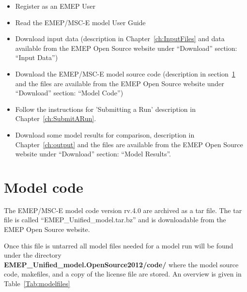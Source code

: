 \begin{itemize}
\item Register as an EMEP User
\item Read the EMEP/MSC-E model User Guide
\item
Download input data (description in Chapter~\ref{ch:InputFiles} and
data available from the EMEP Open Source website under ``Download''
section: ``Input Data'')
\item
Download the EMEP/MSC-E model source code (description in 
section~\ref{sec:ModelCode} and the files are available from the EMEP 
Open Source website under ``Download'' section: ``Model Code'')
\item
Follow the instructions for 'Submitting a Run' description in
Chapter~\ref{ch:SubmitARun}.
\item
Download some model results for comparison, description in
Chapter~\ref{ch:output} and the files are available from the EMEP 
Open Source website under ``Download'' section: ``Model Results''. 


\end{itemize}

\section{Model code}
\label{sec:ModelCode}

The EMEP/MSC-E model code version rv.4.0 are archived as a tar file. 
The tar file is called ``EMEP\_Unified\_model.tar.bz'' and is downloadable from
the EMEP Open Source website.

Once this file is untarred all model files needed for a model run will be found under the
directory \\ {\bf EMEP\_Unified\_model.OpenSource2012/code/} where the model source code, 
makefiles, and a copy of the license file are stored. An overview is given in 
Table~\ref{Tab:modelfiles}

